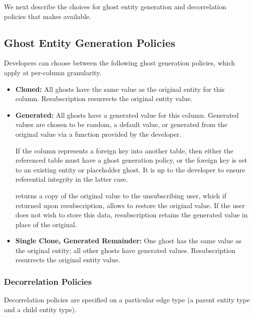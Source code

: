 We next describe the choices for ghost entity generation and decorrelation policies that \sys makes
available.

\subsection{Ghost Entity Generation Policies}
Developers can choose between the following ghost generation policies, which apply at 
per-column granularity.
\begin{itemize}
    \item \textbf{Cloned:} All ghosts have the same value as the original entity for this column.
        Resubscription resurrects the original entity value.

    \item \textbf{Generated:} All ghosts have a generated value for this column. Generated values are
chosen to be random, a default value, or generated from the original value via a function provided by the developer.

        If the column represents a foreign key into another table, then either the referenced table must 
        have a ghost generation policy, or the foreign key is set to an existing entity or
        placeholder ghost.
        It is up to the developer to ensure referential integrity in the latter case.
       
        \sys returns a copy of the original value to the unsubscribing user, which if
        returned upon resubscription, allows \sys to restore the original value. If the user does not wish to
        store this data, resubscription retains the generated value in place of the original.

\item \textbf{Single Clone, Generated Remainder:} One ghost has the same value as the original
        entity; all other ghosts have generated values. Resubscription resurrects the original entity value.
\end{itemize}

\subsubsection{Decorrelation Policies}
Decorrelation policies are specified on a particular edge type (a parent entity type and a child
entity type). 

